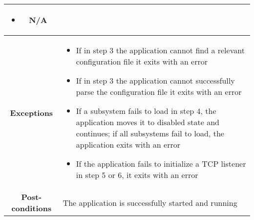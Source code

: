 \begin{longtable}{ |c|p{11.8cm}| }
{\begin{itemize}
                        \item N/A
                    \end{itemize}
                }\\ \hline
                \cellcolor[gray]{0.9} \textbf{Exceptions} & 
                    \begin{itemize}
                        \item If in step 3 the application cannot find a relevant configuration file it exits with an error
                        \item If in step 3 the application cannot successfully parse the configuration file it exits with an error
                        \item If a subsystem fails to load in step 4, the application moves it to disabled state and continues; if all subsystems fail to load, the application exits with an error
                        \item If the application fails to initialize a TCP listener in step 5 or 6, it exits with an error
                    \end{itemize}\\ \hline
                \cellcolor[gray]{0.9} \textbf{Post-conditions} & The application is successfully started and running\\ \hline
            \end{longtable}

